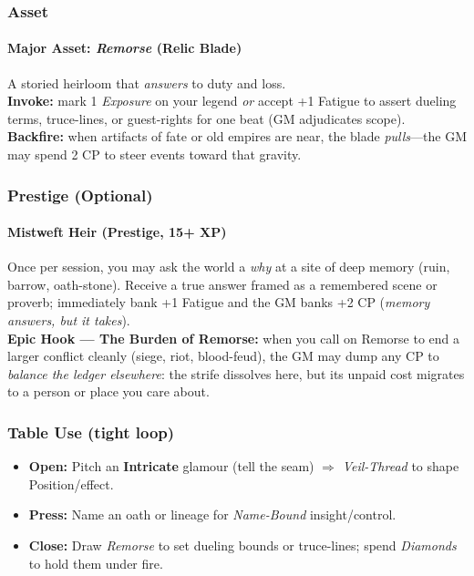 \subsubsection{Asset}
\paragraph{Major Asset: \emph{Remorse} (Relic Blade)}
A storied heirloom that \emph{answers} to duty and loss.\\
\textbf{Invoke:} mark 1 \emph{Exposure} on your legend \emph{or} accept +1 Fatigue to assert dueling terms, truce-lines, or guest-rights for one beat (GM adjudicates scope).\\
\textbf{Backfire:} when artifacts of fate or old empires are near, the blade \emph{pulls}—the GM may spend 2 CP to steer events toward that gravity.

\subsubsection{Prestige (Optional)}
\paragraph{Mistweft Heir (Prestige, 15+ XP)}
Once per session, you may ask the world a \emph{why} at a site of deep memory (ruin, barrow, oath-stone). Receive a true answer framed as a remembered scene or proverb; immediately bank +1 Fatigue and the GM banks +2 CP (\emph{memory answers, but it takes}).\\
\textbf{Epic Hook — The Burden of Remorse:} when you call on Remorse to end a larger conflict cleanly (siege, riot, blood-feud), the GM may dump any CP to \emph{balance the ledger elsewhere}: the strife dissolves here, but its unpaid cost migrates to a person or place you care about.

\subsubsection{Table Use (tight loop)}
\begin{itemize}
  \item \textbf{Open:} Pitch an \textbf{Intricate} glamour (tell the seam) $\Rightarrow$ \emph{Veil-Thread} to shape Position/effect.
  \item \textbf{Press:} Name an oath or lineage for \emph{Name-Bound} insight/control.
  \item \textbf{Close:} Draw \emph{Remorse} to set dueling bounds or truce-lines; spend \emph{Diamonds} to hold them under fire.
\end{itemize}

